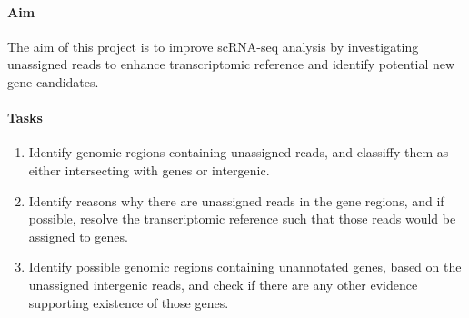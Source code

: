 \paragraph{\textbf{Aim}}

The aim of this project is to improve scRNA-seq analysis
by investigating unassigned reads to enhance transcriptomic reference and identify potential new gene candidates.

\paragraph{\textbf{Tasks}}

\begin{enumerate}
  \item Identify genomic regions containing unassigned reads, and classiffy them as either intersecting with genes or intergenic.
  \item Identify reasons why there are unassigned reads in the gene regions, and if possible,
  resolve the transcriptomic reference such that those reads would be assigned to genes.
  \item Identify possible genomic regions containing unannotated genes, based on the unassigned intergenic reads,
  and check if there are any other evidence supporting existence of those genes.
\end{enumerate}
